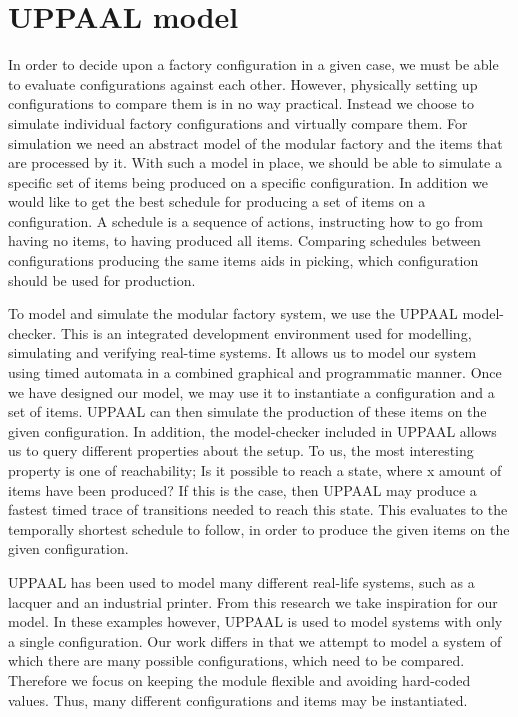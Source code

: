 \chapter{UPPAAL model}\label{ch:uppaalmodel}
In order to decide upon a factory configuration in a given case, we must be able to evaluate configurations against each other. However, physically setting up configurations to compare them is in no way practical. Instead we choose to simulate individual factory configurations and virtually compare them. For simulation we need an abstract model of the modular factory and the items that are processed by it. With such a model in place, we should be able to simulate a specific set of items being produced on a specific configuration. In addition we would like to get the best schedule for producing a set of items on a configuration. A schedule is a sequence of actions, instructing how to go from having no items, to having produced all items. Comparing schedules between configurations producing the same items aids in picking, which configuration should be used for production. 

To model and simulate the modular factory system, we use the UPPAAL model-checker\cite{Larsen97uppaalin}. This is an integrated development environment used for modelling, simulating and verifying real-time systems. It allows us to model our system using timed automata in a combined graphical and programmatic manner. Once we have designed our model, we may use it to instantiate a configuration and a set of items. UPPAAL can then simulate the production of these items on the given configuration. In addition, the model-checker included in UPPAAL allows us to query different properties about the setup. To us, the most interesting property is one of reachability; Is it possible to reach a state, where x amount of items have been produced? If this is the case, then UPPAAL may produce a fastest timed trace of transitions needed to reach this state. This evaluates to the temporally shortest schedule to follow, in order to produce the given items on the given configuration.

UPPAAL has been used to model many different real-life systems, such as a lacquer\cite{so54514} and an industrial printer\cite{Igna2008}. From this research we take inspiration for our model. In these examples however, UPPAAL is used to model systems with only a single configuration. Our work differs in that we attempt to model a system of which there are many possible configurations, which need to be compared. Therefore we focus on keeping the module flexible and avoiding hard-coded values. Thus, many different configurations and items may be instantiated.

